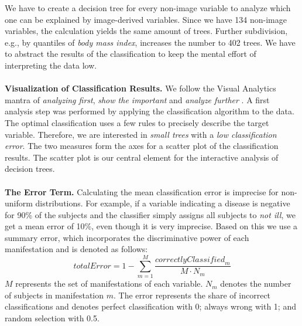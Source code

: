 \documentclass[a4paper,twoside]{style/article}
\begin{document}
We have to create a decision tree for every non-image variable to analyze which one can be explained by image-derived variables.
Since we have 134 non-image variables, the calculation yields the same amount of trees.
Further subdivision, e.g., by quantiles of \emph{body mass index}, increases the number to 402 trees.
We have to abstract the results of the classification to keep the mental effort of interpreting the data low.
\\\\
\noindent \textbf{Visualization of Classification Results.}
We follow the Visual Analytics mantra of \emph{analyzing first}, \emph{show the important} and \emph{analyze further} \cite{Keim}.
A first analysis step was performed by applying the classification algorithm to the data.
The optimal classification uses a few rules to precisely describe the target variable.
Therefore, we are interested in \emph{small trees} with a \emph{low classification error}.
The two measures form the axes for a scatter plot of the classification results.
The scatter plot is our central element for the interactive analysis of decision trees.
\\\\
\noindent \textbf{The Error Term.}
Calculating the mean classification error is imprecise for non-uniform distributions.
For example, if a variable indicating a disease is negative for 90\% of the subjects and the classifier simply assigns all subjects to \emph{not ill}, we get a mean error of 10\%, even though it is very imprecise.
Based on this we use a summary error, which incorporates the discriminative power of each manifestation and is denoted as follows:
\begin{equation}
\textit{totalError} = 1 - \sum_{m=1}^M \frac{\textit{correctlyClassified}_{m}}{M\cdot N_m}
\end{equation}
$M$ represents the set of manifestations of each variable.
$N_m$ denotes the number of subjects in manifestation $m$.
The error represents the share of incorrect classifications and denotes perfect classification with 0; always wrong with 1; and random selection with 0.5.
\end{document}
